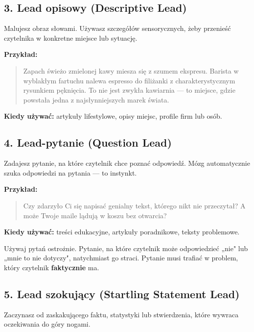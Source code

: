 \documentclass[
  12pt,
  a4paper,
  twoside,
  openright,
  12pt,
  DIV=12,
  BCOR=12mm]{scrbook}
\begin{document}
\subsection{3. Lead opisowy (Descriptive
Lead)}\label{lead-opisowy-descriptive-lead}

Malujesz obraz słowami. Używasz szczegółów sensorycznych, żeby przenieść
czytelnika w konkretne miejsce lub sytuację.

\textbf{Przykład:}

\begin{quote}
Zapach świeżo zmielonej kawy miesza się z szumem ekspresu. Barista w
wyblakłym fartuchu nalewa espresso do filiżanki z charakterystycznym
rysunkiem pęknięcia. To nie jest zwykła kawiarnia --- to miejsce, gdzie
powstała jedna z najsłynniejszych marek świata.
\end{quote}

\textbf{Kiedy używać:} artykuły lifestylowe, opisy miejsc, profile firm
lub osób.

\subsection{4. Lead-pytanie (Question
Lead)}\label{lead-pytanie-question-lead}

Zadajesz pytanie, na które czytelnik chce poznać odpowiedź. Mózg
automatycznie szuka odpowiedzi na pytania --- to instynkt.

\textbf{Przykład:}

\begin{quote}
Czy zdarzyło Ci się napisać genialny tekst, którego nikt nie przeczytał?
A może Twoje maile lądują w koszu bez otwarcia?
\end{quote}

\textbf{Kiedy używać:} treści edukacyjne, artykuły poradnikowe, teksty
problemowe.

\begin{uwaga}
Używaj pytań ostrożnie. Pytanie, na które czytelnik może odpowiedzieć „nie" lub „mnie to nie dotyczy", natychmiast go straci. Pytanie musi trafiać w problem, który czytelnik \textbf{faktycznie} ma.
\end{uwaga}

\subsection{5. Lead szokujący (Startling Statement
Lead)}\label{lead-szokujux105cy-startling-statement-lead}

Zaczynasz od zaskakującego faktu, statystyki lub stwierdzenia, które
wywraca oczekiwania do góry nogami.
\end{document}

